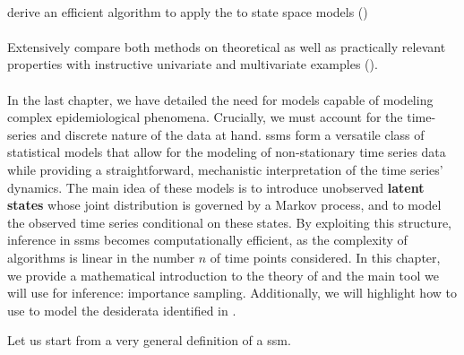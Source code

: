 \begin{tcolorbox}[title={Contributions}]
    \paragraph{}
    derive an efficient algorithm to apply the \acem to state space models ()

    \paragraph{}

    \paragraph{} Extensively compare both methods on theoretical as well as practically relevant properties with instructive univariate and multivariate examples (). 

    \paragraph{}
\end{tcolorbox}
\newpage

In the last chapter, we have detailed the need for models capable of modeling complex epidemiological phenomena. Crucially, we must account for the time-series and discrete nature of the data at hand. 
\Glspl{ssm} form a versatile class of statistical models that allow for the modeling of non-stationary time series data while providing a straightforward, mechanistic interpretation of the time series' dynamics.
The main idea of these models is to introduce unobserved \textbf{latent states} whose joint distribution is governed by a Markov process, and to model the observed time series conditional on these states.
By exploiting this structure, inference in \glspl{ssm} becomes computationally efficient, as the complexity of algorithms is linear in the number $n$ of time points considered. 
In this chapter, we provide a mathematical introduction to the theory of  and the main tool we will use for inference: importance sampling. 
Additionally, we will highlight how to use  to model the desiderata identified in . 

Let us start from a very general definition of a \acrshort{ssm}.

